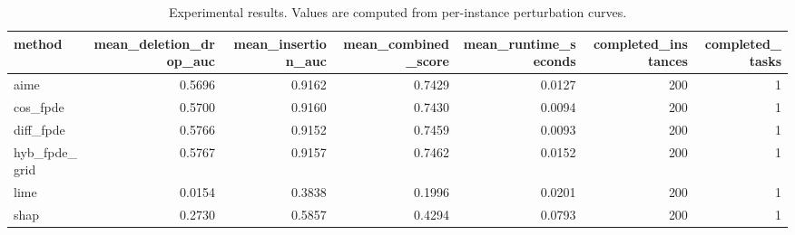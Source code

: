 \begin{table}[t]
\caption{Experimental results. Values are computed from per-instance perturbation curves.}
\label{tab:main_results_computed}
\centering
\begin{tabular}{lrrrrrr}
\toprule
method & mean\_deletion\_drop\_auc & mean\_insertion\_auc & mean\_combined\_score & mean\_runtime\_seconds & completed\_instances & completed\_tasks \\
\midrule
aime & 0.5696 & 0.9162 & 0.7429 & 0.0127 & 200 & 1 \\
cos\_fpde & 0.5700 & 0.9160 & 0.7430 & 0.0094 & 200 & 1 \\
diff\_fpde & 0.5766 & 0.9152 & 0.7459 & 0.0093 & 200 & 1 \\
hyb\_fpde\_grid & 0.5767 & 0.9157 & 0.7462 & 0.0152 & 200 & 1 \\
lime & 0.0154 & 0.3838 & 0.1996 & 0.0201 & 200 & 1 \\
shap & 0.2730 & 0.5857 & 0.4294 & 0.0793 & 200 & 1 \\
\bottomrule
\end{tabular}

\end{table}
